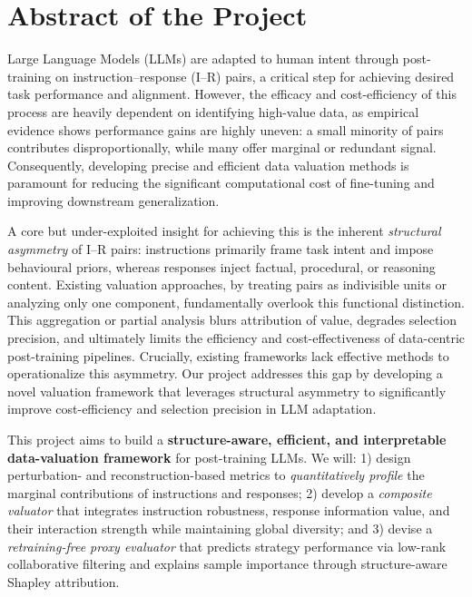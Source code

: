 \documentclass[12pt,a4paper]{article}
\begin{document}
\vspace{-20pt}
\section{Abstract of the Project}
\vspace{-10pt}
Large Language Models (LLMs) are adapted to human intent through post-training on instruction--response (I--R) pairs, a critical step for achieving desired task performance and alignment. However, the efficacy and cost-efficiency of this process are heavily dependent on identifying high-value data, as empirical evidence shows performance gains are highly uneven: a small minority of pairs contributes disproportionally, while many offer marginal or redundant signal. Consequently, developing precise and efficient data valuation methods is paramount for reducing the significant computational cost of fine-tuning and improving downstream generalization. 

A core but under-exploited insight for achieving this is the inherent \emph{structural asymmetry} of I--R pairs: instructions primarily frame task intent and impose behavioural priors, whereas responses inject factual, procedural, or reasoning content. Existing valuation approaches, by treating pairs as indivisible units or analyzing only one component, fundamentally overlook this functional distinction. This aggregation or partial analysis blurs attribution of value, degrades selection precision, and ultimately limits the efficiency and cost-effectiveness of data-centric post-training pipelines. Crucially, existing frameworks lack effective methods to operationalize this asymmetry. Our project addresses this gap by developing a novel valuation framework that leverages structural asymmetry to significantly improve cost-efficiency and selection precision in LLM adaptation.

This project aims to build a \textbf{structure-aware, efficient, and interpretable data-valuation framework} for post-training LLMs. We will: 1) design perturbation- and reconstruction-based metrics to \emph{quantitatively profile} the marginal contributions of instructions and responses; 2) develop a \emph{composite valuator} that integrates instruction robustness, response information value, and their interaction strength while maintaining global diversity; and 3) devise a \emph{retraining-free proxy evaluator} that predicts strategy performance via low-rank collaborative filtering and explains sample importance through structure-aware Shapley attribution.
\end{document}
